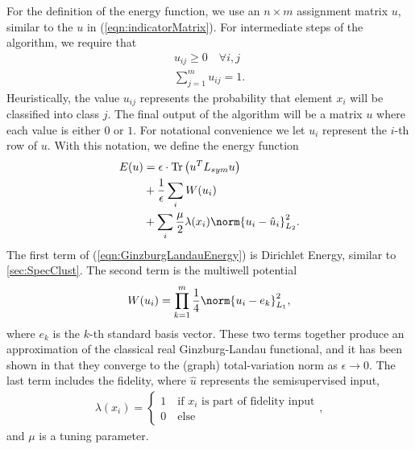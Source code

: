 \documentclass[journal]{IEEEtran}
\begin{document}
For the definition of the energy function, we use an $n \times m$ assignment
matrix $u$, similar to the $u$ in (\ref{eqn:indicatorMatrix}). For intermediate steps
of the algorithm, we require that
\begin{align}
  u_{ij} \geq 0 \quad \forall i,j \\
  \sum_{j=1}^m u_{ij} = 1.
\end{align}
Heuristically, the value $u_{ij}$ represents the probability that element $x_i$
will be classified into class $j$. The final output of the algorithm will be a
matrix $u$ where each value is either $0$ or $1$. For notational convenience we
let $u_i$ represent the $i$-th row of $u$. With this notation, we define the
energy function
\begin{align}\label{eqn:GinzburgLandauEnergy}
  E(u) &= \epsilon \cdot \text{Tr}\left(u^TL_{sym} u\right) \nonumber \\
       &+ \frac{1}{\epsilon}\sum_i W(u_i) \nonumber \\
       &+ \sum_i \frac{\mu}{2}\lambda(x_i)\norm{u_i - \hat{u}_i}^2_{L_2}.
\end{align}
The first term of (\ref{eqn:GinzburgLandauEnergy}) is Dirichlet Energy, similar
to \ref{sec:SpecClust}. The second term is the multiwell potential
\begin{align}
  W(u_i) = \prod_{k=1}^{m}\frac{1}{4}\norm{u_i - e_k}_{L_1}^2,
\end{align}
where $e_k$ is the $k$-th standard basis vector. These two terms together
produce an approximation of the classical real Ginzburg-Landau functional, and
it has been shown in \cite{gennip2012} that they converge to the (graph)
total-variation norm as $\epsilon \to 0$. The last term includes the fidelity,
where $\hat{u}$ represents the semisupervised input,
\begin{align}
  \lambda(x_i) = \begin{cases} 1 \quad \text{if $x_i$ is part of fidelity input}\\
    0 \quad
    \text{else}
  \end{cases},
\end{align}
and $\mu$ is a tuning parameter.
\end{document}
